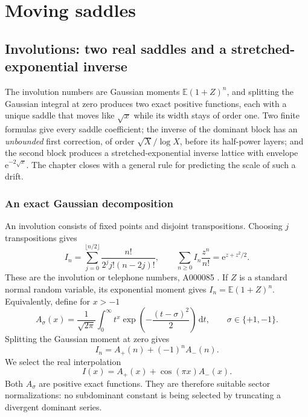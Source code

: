 \documentclass[11pt,openany]{book}
\numberwithin{equation}{chapter}
\theoremstyle{plain}
\theoremstyle{definition}
\theoremstyle{remark}
\newcommand{\ee}{\mathrm e}
\newcommand{\dd}{\,\mathrm d}                 %
\begin{document}
\part{Moving saddles}
\label{ct:part:saddles}

\chapter{Involutions: two real saddles and a stretched-exponential inverse}
\label{ct:ch:involutions}

The involution numbers are Gaussian moments $\mathbb E(1+Z)^n$, and splitting
the Gaussian integral at zero produces two exact positive functions, each
with a unique saddle that moves like $\sqrt x$ while its width stays of order
one.  Two finite formulas give every saddle coefficient; the inverse of the
dominant block has an \emph{unbounded} first correction, of order
$\sqrt X/\log X$, before its half-power layers; and the second block
produces a stretched-exponential inverse lattice with envelope
$\ee^{-2\sqrt{x}}$.  The chapter closes with a general rule for predicting
the scale of such a drift.

\section{An exact Gaussian decomposition}

An involution consists of fixed points and disjoint transpositions. Choosing $j$ transpositions gives
\begin{equation}
 I_n=\sum_{j=0}^{\lfloor n/2\rfloor}
        \frac{n!}{2^jj!(n-2j)!},\qquad
 \sum_{n\ge0}I_n\frac{z^n}{n!}=\ee^{z+z^2/2}.
 \label{t2:eq:involution-enumeration}
\end{equation}
These are the involution or telephone numbers, A000085 \cite{oeisinvolution}. If $Z$ is a standard normal random variable, its exponential moment gives $I_n=\mathbb E(1+Z)^n$. Equivalently, define for $x>-1$
\begin{equation}
 A_\sigma(x)=\frac1{\sqrt{2\pi}}\int_0^\infty
          t^x\exp\!\left(-\frac{(t-\sigma)^2}{2}\right)\dd t,
 \qquad \sigma\in\{+1,-1\}.
 \label{t2:eq:involution-A}
\end{equation}
Splitting the Gaussian moment at zero gives
\begin{equation}
 I_n=A_+(n)+(-1)^nA_-(n).
 \label{t2:eq:involution-exact-lattice}
\end{equation}
We select the real interpolation
\begin{equation}
 I(x)=A_+(x)+\cos(\pi x)A_-(x).
 \label{t2:eq:involution-cont}
\end{equation}
Both $A_\sigma$ are positive exact functions. They are therefore suitable sector normalizations: no subdominant constant is being selected by truncating a divergent dominant series.
\end{document}
